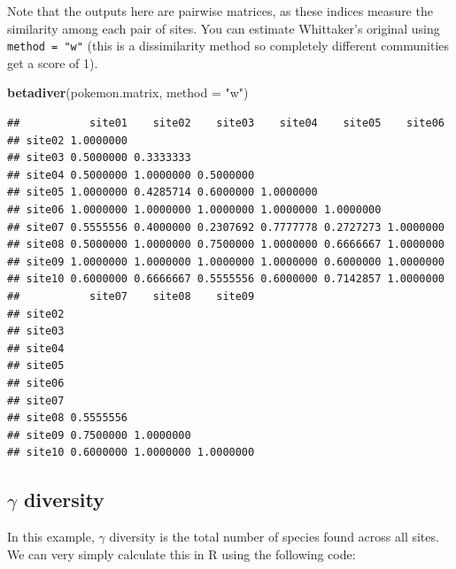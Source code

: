 \documentclass[]{book}
\newenvironment{Shaded}{\begin{snugshade}}{\end{snugshade}}
\newcommand{\KeywordTok}[1]{\textcolor[rgb]{0.13,0.29,0.53}{\textbf{{#1}}}}
\newcommand{\DataTypeTok}[1]{\textcolor[rgb]{0.13,0.29,0.53}{{#1}}}
\newcommand{\StringTok}[1]{\textcolor[rgb]{0.31,0.60,0.02}{{#1}}}
\newcommand{\NormalTok}[1]{{#1}}
\begin{document}
Note that the outputs here are pairwise matrices, as these indices
measure the similarity among each pair of sites. You can estimate
Whittaker's original using \texttt{method\ =\ "w"} (this is a
dissimilarity method so completely different communities get a score of
1).

\begin{Shaded}
\begin{Highlighting}[]
\KeywordTok{betadiver}\NormalTok{(pokemon.matrix, }\DataTypeTok{method =} \StringTok{"w"}\NormalTok{)}
\end{Highlighting}
\end{Shaded}

\begin{verbatim}
##           site01    site02    site03    site04    site05    site06
## site02 1.0000000                                                  
## site03 0.5000000 0.3333333                                        
## site04 0.5000000 1.0000000 0.5000000                              
## site05 1.0000000 0.4285714 0.6000000 1.0000000                    
## site06 1.0000000 1.0000000 1.0000000 1.0000000 1.0000000          
## site07 0.5555556 0.4000000 0.2307692 0.7777778 0.2727273 1.0000000
## site08 0.5000000 1.0000000 0.7500000 1.0000000 0.6666667 1.0000000
## site09 1.0000000 1.0000000 1.0000000 1.0000000 0.6000000 1.0000000
## site10 0.6000000 0.6666667 0.5555556 0.6000000 0.7142857 1.0000000
##           site07    site08    site09
## site02                              
## site03                              
## site04                              
## site05                              
## site06                              
## site07                              
## site08 0.5555556                    
## site09 0.7500000 1.0000000          
## site10 0.6000000 1.0000000 1.0000000
\end{verbatim}

\subsection{\texorpdfstring{\(\gamma\)
diversity}{\textbackslash{}gamma diversity}}\label{gamma-diversity}

In this example, \(\gamma\) diversity is the total number of species
found across all sites. We can very simply calculate this in R using the
following code:

\begin{Shaded}
\end{Shaded}
\end{document}
